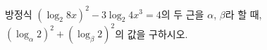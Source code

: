 방정식 $(\log_2 8x)^{2}-3\log_2 4x^{3}=4$의 두 근을 $\alpha$, $\beta$라 할 때, $(\log_{\alpha} 2)^{2}+(\log_{\beta} 2)^{2}$의 값을 구하시오.
